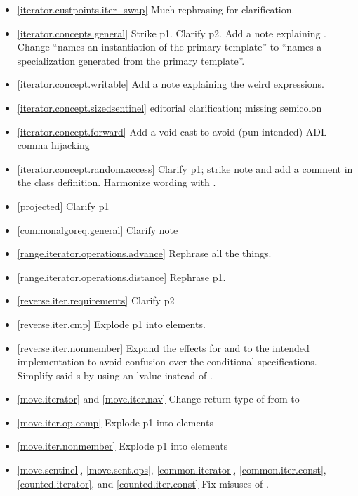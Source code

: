 \begin{itemize}
\item \ref{iterator.custpoints.iter_swap} Much rephrasing for clarification.
\item \ref{iterator.concepts.general} Strike p1. Clarify p2.
  Add a note explaining .
  Change ``names an instantiation of the primary template'' to
  ``names a specialization generated from the primary template''.
\item \ref{iterator.concept.writable} Add a note explaining the weird
   expressions.
\item \ref{iterator.concept.sizedsentinel} editorial clarification;
  missing semicolon
\item \ref{iterator.concept.forward} Add a void cast to avoid (pun intended) ADL
  comma hijacking
\item \ref{iterator.concept.random.access} Clarify p1; strike note and add a
   comment in the class definition. Harmonize wording with
  .
\item \ref{projected} Clarify p1
\item \ref{commonalgoreq.general} Clarify note
\item \ref{range.iterator.operations.advance} Rephrase all the things.
\item \ref{range.iterator.operations.distance} Rephrase p1.
\item \ref{reverse.iter.requirements} Clarify p2
\item \ref{reverse.iter.cmp} Explode p1 into \constraints elements.
\item \ref{reverse.iter.nonmember} Expand the effects for  and
   to the intended implementation to avoid confusion over the
  conditional  specifications. Simplify said s
  by using an lvalue  instead of .
\item \ref{move.iterator} and \ref{move.iter.nav} Change return type of
   from  to 
\item \ref{move.iter.op.comp} Explode p1 into \constraints elements
\item \ref{move.iter.nonmember} Explode p1 into \constraints elements
\item \ref{move.sentinel}, \ref{move.sent.ops}, \ref{common.iterator},
  \ref{common.iter.const}, \ref{counted.iterator},
  and \ref{counted.iter.const} Fix misuses of .

\end{itemize}
